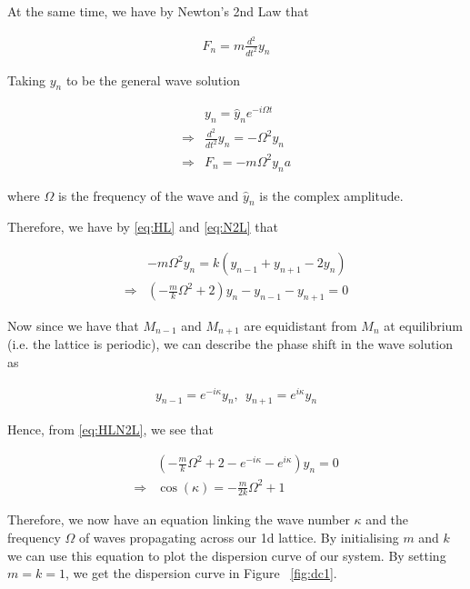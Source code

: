 At the same time, we have by Newton's 2nd Law that

\begin{align}
  F_{n}=m\frac{d^{2}}{dt^{2}}y_{n}
\end{align}

Taking $y_n$ to be the general wave solution

\begin{align}
  &y_{n}=\hat{y}_{n}e^{-i\Omega t} \\
  \Rightarrow &\frac{d^{2}}{dt^{2}}y_{n}=-\Omega^{2}y_{n} \\
  \Rightarrow &F_{n}=-m\Omega^{2}y_{n}a \label{eq:N2L}
\end{align}

where $\Omega$ is the frequency of the wave and $\hat{y}_{n}$ is the complex
amplitude.

Therefore, we have by \eqref{eq:HL} and \eqref{eq:N2L} that

\begin{align}
  &-m\Omega^{2}y_{n}=k\left(y_{n-1}+y_{n+1}-2y_{n}\right) \\
  \Rightarrow &\left(-\frac{m}{k}\Omega^{2}+2\right)y_{n}-y_{n-1}-y_{n+1}=0
    \label{eq:HLN2L}
\end{align}

Now since we have that $M_{n-1}$ and $M_{n+1}$ are equidistant from $M_{n}$ at
equilibrium (i.e. the lattice is periodic), we can describe the phase shift in
the wave solution as

\begin{align}
  y_{n-1}=e^{-i\kappa}y_n,\ \ y_{n+1}=e^{i\kappa}y_n
\end{align}

Hence, from \eqref{eq:HLN2L}, we see that

\begin{align}
  &\left(-\frac{m}{k}\Omega^{2}+2-e^{-i\kappa}-e^{i\kappa}\right)y_{n}=0 \\
  \Rightarrow &\cos\left(\kappa\right)=-\frac{m}{2k}\Omega^{2}+1
\end{align}

Therefore, we now have an equation linking the wave number $\kappa$ and the
frequency $\Omega$ of waves propagating across our 1d lattice. By initialising
$m$ and $k$ we can use this equation to plot the dispersion curve of our
system. By setting $m=k=1$, we get the dispersion curve in Figure
~\ref{fig:dc1}.

